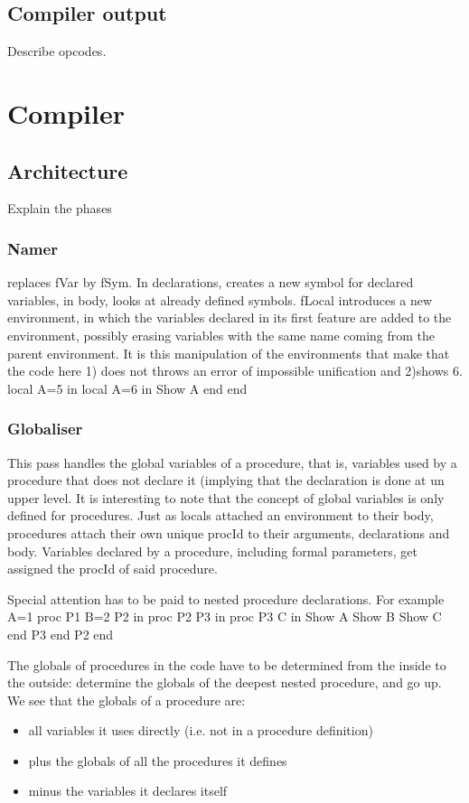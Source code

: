 \documentclass[draft,a4paper]{memoir}
\begin{document}
\section{Compiler output}
Describe opcodes.


\chapter{Compiler}
\section{Architecture}
Explain the phases
\subsection{Namer}
replaces fVar by fSym. In declarations, creates a new symbol for declared variables, in body, looks at already defined symbols.
fLocal introduces a new environment, in which the variables declared in its first feature are added to the environment, possibly erasing variables with the same name coming from the parent environment.
It is this manipulation of the environments that make that the code here 1) does not throws an error of impossible unification and 2)shows 6.
local
   A=5
in
   local 
      A=6
   in
      {Show A}
   end
end

\subsection{Globaliser}            
This pass handles the global variables of a procedure, that is, variables used by a procedure that does not declare it (implying that the declaration is done at un upper level. It is interesting to note that the concept of global variables is only defined for procedures.
Just as locals attached an environment to their body, procedures attach their own unique procId to their arguments, declarations and body.
Variables declared by a procedure, including formal parameters, get assigned the procId of said procedure.

Special attention has to be paid to nested procedure declarations. For example
A=1
proc {P1}                 %
   B=2
   P2
in
   proc {P2}              %
      P3 
   in
      proc {P3}           %
         C
      in
         {Show A}
         {Show B}
         {Show C}
      end
      {P3}
   end
   {P2}
end

The globals of procedures in the code have to be determined from the inside to the outside: determine the globals of the deepest nested procedure, and go up. 
We see that the globals of a procedure are:
\begin{itemize}
  \item all variables it uses directly (i.e. not in a procedure definition)
  \item plus the globals of all the procedures it defines
  \item minus the variables it declares itself
\end{itemize}
\end{document}
